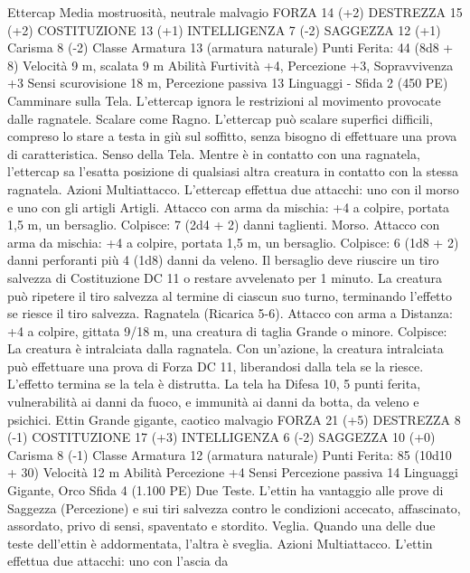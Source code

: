 \begin{multicols}{2}
Ettercap
Media mostruosità, neutrale malvagio
FORZA 14 (+2)
DESTREZZA 15 (+2)
COSTITUZIONE 13 (+1)
INTELLIGENZA 7 (-2)
SAGGEZZA 12 (+1)
Carisma 8 (-2)
Classe Armatura 13 (armatura naturale)
\hspace*{0pt}\hfill{Punti Ferita}: 44 (8d8 + 8)
Velocità 9 m, scalata 9 m
Abilità Furtività +4, Percezione +3, Sopravvivenza +3
Sensi scurovisione 18 m, Percezione passiva 13
Linguaggi -
Sfida 2 (450 PE)
Camminare sulla Tela. L’ettercap ignora le restrizioni al
movimento provocate dalle ragnatele.
Scalare come Ragno. L’ettercap può scalare superfici difficili,
compreso lo stare a testa in giù sul soffitto, senza bisogno di
effettuare una prova di caratteristica.
Senso della Tela. Mentre è in contatto con una ragnatela,
l’ettercap sa l’esatta posizione di qualsiasi altra creatura in
contatto con la stessa ragnatela.
Azioni
Multiattacco. L’ettercap effettua due attacchi: uno con il morso e
uno con gli artigli
Artigli. Attacco con arma da mischia: +4 a colpire, portata 1,5
m, un bersaglio.
Colpisce: 7 (2d4 + 2) danni taglienti.
Morso. Attacco con arma da mischia: +4 a colpire, portata 1,5
m, un bersaglio.
Colpisce: 6 (1d8 + 2) danni perforanti più 4 (1d8) danni da
veleno. Il bersaglio deve riuscire un tiro salvezza di Costituzione
DC 11 o restare avvelenato per 1 minuto. La creatura può
ripetere il tiro salvezza al termine di ciascun suo turno,
terminando l’effetto se riesce il tiro salvezza.
Ragnatela (Ricarica 5-6). Attacco con arma a Distanza: +4 a
colpire, gittata 9/18 m, una creatura di taglia Grande o minore.
Colpisce: La creatura è intralciata dalla ragnatela. Con
un’azione, la creatura intralciata può effettuare una prova di
Forza DC 11, liberandosi dalla tela se la riesce. L’effetto termina
se la tela è distrutta. La tela ha Difesa 10, 5 punti ferita,
vulnerabilità ai danni da fuoco, e immunità ai danni da botta,
da veleno e psichici.
Ettin
Grande gigante, caotico malvagio
FORZA 21 (+5)
DESTREZZA 8 (-1)
COSTITUZIONE 17 (+3)
INTELLIGENZA 6 (-2)
SAGGEZZA 10 (+0)
Carisma 8 (-1)
Classe Armatura 12 (armatura naturale)
\hspace*{0pt}\hfill{Punti Ferita}: 85 (10d10 + 30)
Velocità 12 m
Abilità Percezione +4
Sensi Percezione passiva 14
Linguaggi Gigante, Orco
Sfida 4 (1.100 PE)
Due Teste. L’ettin ha vantaggio alle prove di Saggezza
(Percezione) e sui tiri salvezza contro le condizioni accecato,
affascinato, assordato, privo di sensi, spaventato e stordito.
Veglia. Quando una delle due teste dell’ettin è addormentata,
l’altra è sveglia.
Azioni
Multiattacco. L’ettin effettua due attacchi: uno con l’ascia da

\end{multicols}
